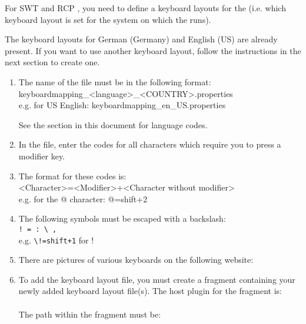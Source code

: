 For SWT and RCP \gdauts{}, you need to define a keyboard layouts for the \gdaut{} (i.e. which keyboard layout is set for the system on which the \gdaut{} runs).

The  keyboard layouts for German (Germany) and English (US) are already present. If you want to use another keyboard layout, follow the instructions in the next section to create one.  

\begin{enumerate}
\item The name of the file must be in the following format:\\
keyboardmapping\_<language>\_<COUNTRY>.properties\\
e.g. for US English: keyboardmapping\_en\_US.properties

See the section in this document  for language codes.
\item In the file, enter the codes for all characters which require you to press a modifier key. 
\item The format for these codes is:\\
<Character>=<Modifier>+<Character without modifier>\\
e.g. for the @ character: @=shift+2
\item The following symbols must be escaped with a backslash:\\
\verb+! = : \ ,+\\
e.g. \verb?\!=shift+1? for !
\item There are pictures of various keyboards on the following website:\\
\item To add the keyboard layout file, you must create a fragment containing your newly added keyboard layout file(s). The host plugin for the fragment is:\\
\\
The path within the fragment must be:\\
\\


\end{enumerate}
